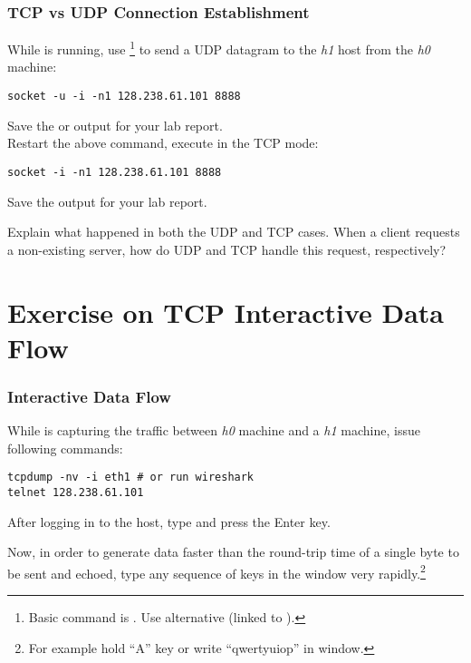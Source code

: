 \documentclass{../UTNetLab}
\begin{document}
\section{TCP vs UDP Connection Establishment}
While  is running, use \footnote{Basic command is . Use alternative  (linked to ).} to send a UDP datagram to the \textit{h1} host from the \textit{h0} machine:
\begin{lstlisting}[emph={h0,h1,netlab}]
socket -u -i -n1 128.238.61.101 8888
    \end{lstlisting}
{Save} the  or  output for your lab report. \\
Restart the above  command, execute  in the TCP mode:
\begin{lstlisting}[emph={h1,netlab}]
socket -i -n1 128.238.61.101 8888
    \end{lstlisting}
{Save} the  output for your lab report.

\begin{report}
    \item Explain what happened in both the UDP and TCP cases.
    When a client requests a non-existing server, how do UDP and TCP handle this request, respectively?
\end{report}

\part{Exercise on TCP Interactive Data Flow}
\section{Interactive Data Flow}
While  is capturing the traffic between \textit{h0} machine and a \textit{h1} machine, issue following commands:
\begin{lstlisting}[emph={h1,netlab}]
tcpdump -nv -i eth1 # or run wireshark
telnet 128.238.61.101
    \end{lstlisting}
After logging in to the host, type  and press the {Enter} key.

Now, in order to generate data faster than the round-trip time of a single byte to be sent and echoed, type any sequence of keys in the  window very rapidly.\footnote{For example hold ``A'' key or write ``qwertyuiop'' in  window.}
\end{document}
